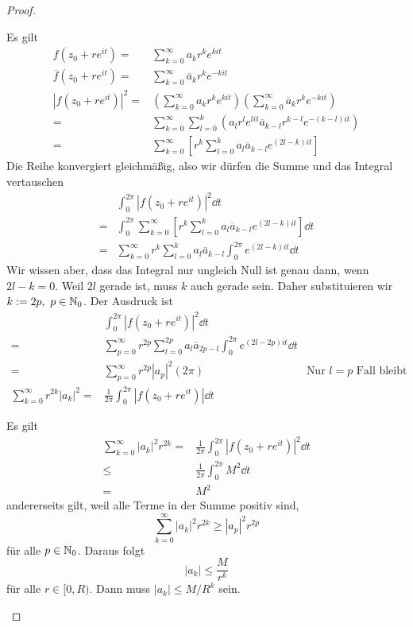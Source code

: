 \begin{proof}
	\begin{parts}
	\item Es gilt
		\begin{align*}
			f(z_0+re^{it})=& \sum_{k=0}^\infty a_kr^k e^{kit}\\
			\overline{f}(z_0+re^{it})=&\sum_{k=0}^\infty \overline{a}_k r^k e^{-kit}\\
			|f(z_0+re^{it})|^2=&\left( \sum_{k=0}^\infty a_k r^k e^{kit}\right)\left( \sum_{k=0}^\infty \overline{a}_k r^k e^{-kit} \right)\\
			=&\sum_{k=0}^\infty\sum_{l=0}^k\left(a_l r^l e^{lit} \overline{a}_{k-l} r^{k-l}e^{-(k-l)it} \right)\\
			=&\sum_{k=0}^\infty \left[ r^k\sum_{l=0}^k a_l \overline{a}_{k-l}e^{(2l-k)it} \right] 
		\end{align*}
		Die Reihe konvergiert gleichmäßig, also wir dürfen die Summe und das Integral vertauschen
		\begin{align*}
			&\int_0^{2\pi} |f(z_0+re^{it})|^2\dd{t}\\
			=&\int_{0}^{2\pi} \sum_{k=0}^\infty \left[ r^k \sum_{l=0}^k a_l \overline{a}_{k-l} e^{(2l-k)it} \right] \dd{t}\\
			=&\sum_{k=0}^\infty r^k \sum_{l=0}^k a_l \overline{a}_{k-l} \int_0^{2\pi} e^{(2l-k)it}\dd{t}
		\end{align*}
		Wir wissen aber, dass das Integral nur ungleich Null ist genau dann, wenn $2l-k=0$. Weil $2l$ gerade ist, muss $k$ auch gerade sein. Daher substituieren wir $k:=2p,~p\in \mathbb{N}_0$. Der Ausdruck ist
		\begin{align*}
			&\int_0^{2\pi} |f(z_0+re^{it})|^2\dd{t}\\
			=& \sum_{p=0}^\infty r^{2p} \sum_{l=0}^{2p} a_l \overline{a}_{2p-l} \int_0^{2\pi} e^{(2l-2p)it}\dd{t}\\
			=&\sum_{p=0}^\infty r^{2p}|a_p|^2 (2\pi) &\text{Nur }l=p\text{ Fall bleibt}\\
\sum_{k=0}^\infty r^{2k} |a_k|^2=& 			\frac{1}{2\pi}\int_0^{2\pi} |f(z_0+re^{it})|\dd{t}
		\end{align*}
	\item Es gilt
		\begin{align*}
			\sum_{k=0}^\infty |a_k|^2 r^{2k}=& \frac{1}{2\pi}\int_0^{2\pi} |f(z_0+re^{it})|^2\dd{t}\\
			\le& \frac{1}{2\pi}\int_0^{2\pi} M^2\dd{t}\\
			=& M^2
		\end{align*}
		andererseits gilt, weil alle Terme in der Summe positiv sind,
		\[
		\sum_{k=0}^\infty |a_k|^2r^{2k} \ge |a_p|^2 r^{2p}
		\] 
		f\"{u}r alle $p\in \mathbb{N}_0$. Daraus folgt
		\[
		|a_k| \le \frac{M}{r^k}
		\]
		f\"{u}r alle $r\in [0,R)$. Dann muss $|a_k|\le M / R^k$ sein.\qedhere
	\end{parts}
\end{proof}
